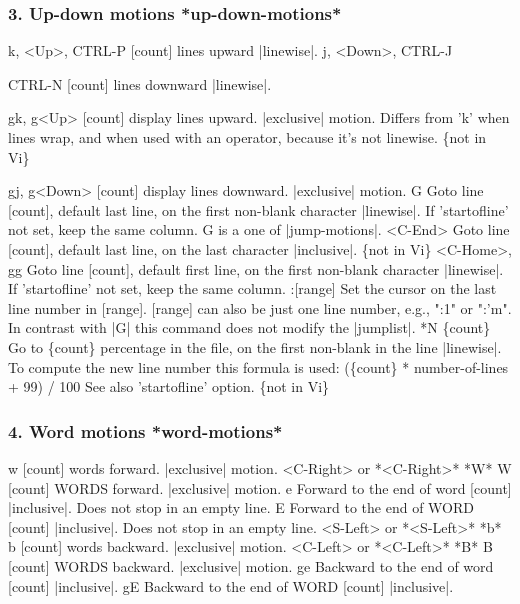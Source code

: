 \documentclass{beamer}
\begin{document}
\begin{frame}
  \frametitle{3. Up-down motions					*up-down-motions*}
  k, <Up>, CTRL-P			[count] lines upward |linewise|.
  j, <Down>, CTRL-J

  CTRL-N			[count] lines downward |linewise|.

  gk, g<Up>			[count] display lines upward.  |exclusive| motion.
  Differs from 'k' when lines wrap, and when used with
  an operator, because it's not linewise.  \{not in Vi\}

  gj, g<Down>			[count] display lines downward.  |exclusive| motion.
  G			Goto line [count], default last line, on the first
  non-blank character |linewise|.  If 'startofline' not
  set, keep the same column.
  G is a one of |jump-motions|.
  <C-End>			Goto line [count], default last line, on the last character |inclusive|. \{not in Vi\}
  <C-Home>, gg			Goto line [count], default first line, on the first non-blank character |linewise|.  If 'startofline' not set, keep the same column.
  :[range]		Set the cursor on the last line number in [range].
  [range] can also be just one line number, e.g., ":1"
  or ":'m".
  In contrast with |G| this command does not modify the
  |jumplist|.
  *N%
  \{count\}		Go to \{count\} percentage in the file, on the first
  non-blank in the line |linewise|.  To compute the new
  line number this formula is used:
  (\{count\} * number-of-lines + 99) / 100
  See also 'startofline' option.  \{not in Vi\}
\end{frame}

\begin{frame}
  \frametitle{4. Word motions						*word-motions*}
  w			[count] words forward.  |exclusive| motion.
  <C-Right>	or					*<C-Right>* *W*
  W			[count] WORDS forward.  |exclusive| motion.
  e			Forward to the end of word [count] |inclusive|.
  Does not stop in an empty line.
  E			Forward to the end of WORD [count] |inclusive|.
  Does not stop in an empty line.
  <S-Left>	or					*<S-Left>* *b*
  b			[count] words backward.  |exclusive| motion.
  <C-Left>	or					*<C-Left>* *B*
  B			[count] WORDS backward.  |exclusive| motion.
  ge			Backward to the end of word [count] |inclusive|.
  gE			Backward to the end of WORD [count] |inclusive|.
\end{frame}
\end{document}

